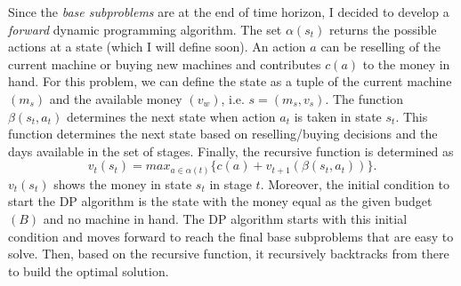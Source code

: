 \documentclass{article}
\begin{document}
Since the \emph{base subproblems} are at the end of time horizon, I decided to develop a \emph{forward} dynamic programming algorithm.
The set $\alpha(s_t)$ returns the possible actions at a state (which I will define soon). An action $a$ can be reselling of the current machine or buying new machines and contributes $c(a)$ to the money in hand.
For this problem, we can define the state as a tuple of the current machine $(m_s)$ and the available money $(v_w)$, i.e. $s = (m_s, v_s)$.
The function $\beta(s_t, a_t)$ determines the next state when action $a_t$ is taken in state $s_t$.
This function determines the next state based on reselling/buying decisions and the days available in the set of stages.
Finally, the recursive function is determined as
$$v_t(s_t) = max_{a \in \alpha(t)}\{c(a) + v_{t+1}(\beta(s_t,a_t))\}.$$
$v_t(s_t)$ shows the money in state $s_t$ in stage $t$. 
Moreover, the initial condition to start the DP algorithm is the state with the money equal as the given budget $(B)$ and no machine in hand. 
The DP algorithm starts with this initial condition and moves forward to reach the final base subproblems that are easy to solve. Then, based on the recursive function, it recursively backtracks from there to build the optimal solution.
\end{document}
